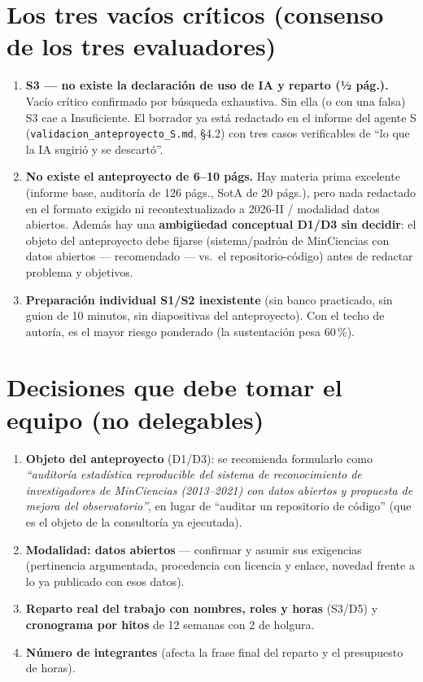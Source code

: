 \section{Los tres vacíos críticos (consenso de los tres evaluadores)}

\begin{enumerate}
  \item \textbf{S3 — no existe la declaración de uso de IA y reparto (½ pág.).}
        Vacío crítico confirmado por búsqueda exhaustiva. Sin ella (o con una
        falsa) S3 cae a Insuficiente. El borrador ya está redactado en el
        informe del agente S (\texttt{validacion\_anteproyecto\_S.md}, \S4.2)
        con tres casos verificables de ``lo que la IA sugirió y se descartó''.
  \item \textbf{No existe el anteproyecto de 6--10 págs.} Hay materia prima
        excelente (informe base, auditoría de 126 págs., SotA de 20 págs.),
        pero nada redactado en el formato exigido ni recontextualizado a
        2026-II / modalidad datos abiertos. Además hay una \textbf{ambigüedad
        conceptual D1/D3 sin decidir}: el objeto del anteproyecto debe fijarse
        (sistema/padrón de MinCiencias con datos abiertos — recomendado — vs.\
        el repositorio-código) antes de redactar problema y objetivos.
  \item \textbf{Preparación individual S1/S2 inexistente} (sin banco
        practicado, sin guion de 10 minutos, sin diapositivas del
        anteproyecto). Con el techo de autoría, es el mayor riesgo ponderado
        (la sustentación pesa 60\,\%).
\end{enumerate}

\section{Decisiones que debe tomar el equipo (no delegables)}

\begin{enumerate}
  \item \textbf{Objeto del anteproyecto} (D1/D3): se recomienda formularlo como
        \emph{``auditoría estadística reproducible del sistema de reconocimiento
        de investigadores de MinCiencias (2013--2021) con datos abiertos y
        propuesta de mejora del observatorio''}, en lugar de ``auditar un
        repositorio de código'' (que es el objeto de la consultoría ya
        ejecutada).
  \item \textbf{Modalidad: datos abiertos} — confirmar y asumir sus exigencias
        (pertinencia argumentada, procedencia con licencia y enlace, novedad
        frente a lo ya publicado con esos datos).
  \item \textbf{Reparto real del trabajo con nombres, roles y horas} (S3/D5) y
        \textbf{cronograma por hitos} de 12 semanas con 2 de holgura.
  \item \textbf{Número de integrantes} (afecta la frase final del reparto y el
        presupuesto de horas).
\end{enumerate}
